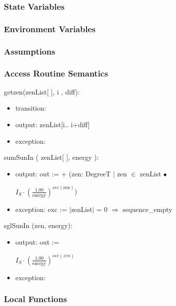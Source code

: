 \documentclass[12pt, titlepage]{article}
\begin{document}
\subsubsection{State Variables}


\subsubsection{Environment Variables}


\subsubsection{Assumptions}


\subsubsection{Access Routine Semantics}

\noindent getzen(zenList[ ], i , diff):
\begin{itemize}
\item transition: 
\item output: zenList[i.. i+diff]
\item exception: 
\end{itemize}

\noindent sumSunIn (  zenList[ ], energy ):
\begin{itemize}
\item output: out := + (zen: DegreeT $|$ zen $\in$ zenList $\bullet$ 
\begin{center}\large
$I_{S} \cdot (\frac{1.00}{\text{energy}})^{sec(\text{zen})} $)
\end{center}
\item exception: exc := $|$zenList$|$ = 0 $\Rightarrow$ sequence\_empty
\end{itemize}

\noindent sglSunIn (zen, energy):
\begin{itemize}
\item output: out := 
\begin{center}\large
$I_{S} \cdot (\frac{1.00}{\text{energy}})^{sec(zen)} $
\end{center}
\item exception: 
\end{itemize}


\subsubsection{Local Functions}
\end{document}
